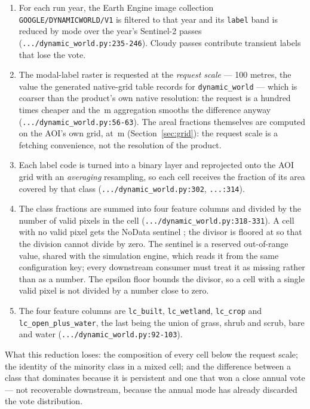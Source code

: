 \documentclass[11pt,a4paper]{article}
\newcommand{\code}[1]{\texttt{#1}}
\begin{document}
\begin{enumerate}
\item For each run year, the Earth Engine image collection
\code{GOOGLE/DYNAMICWORLD/V1} is filtered to that year and its \code{label}
band is reduced by mode over the year's Sentinel-2 passes
(\code{.../dynamic\_world.py:235-246}). Cloudy passes contribute transient
labels that lose the vote.
\item The modal-label raster is requested at the \emph{request scale} --- 100
metres, the value the generated native-grid table records for
\code{dynamic\_world} --- which is coarser than the product's own native
resolution: the request is a hundred times cheaper and the
\,m aggregation smooths the difference anyway
(\code{.../dynamic\_world.py:56-63}). The areal fractions themselves are
computed on the AOI's own grid, at \,m
(Section~\ref{sec:grid}): the request scale is a fetching convenience, not
the resolution of the product.
\item Each label code is turned into a binary layer and reprojected onto the
AOI grid with an \emph{averaging} resampling, so each cell receives the
fraction of its area covered by that class
(\code{.../dynamic\_world.py:302}, \code{...:314}).
\item The class fractions are summed into four feature columns and divided by
the number of valid pixels in the cell
(\code{.../dynamic\_world.py:318-331}). A cell with no valid pixel gets the
NoData sentinel ; the divisor is floored at
 so that the division cannot divide by
zero. The sentinel is a reserved out-of-range value, shared with the
simulation engine, which reads it from the same configuration key; every
downstream consumer must treat it as missing rather than as a number. The
epsilon floor bounds the divisor, so a cell with a single valid pixel is not
divided by a number close to zero.
\item The four feature columns are \code{lc\_built},
\code{lc\_wetland}, \code{lc\_crop} and \code{lc\_open\_plus\_water}, the last
being the union of grass, shrub and scrub, bare and water
(\code{.../dynamic\_world.py:92-103}).
\end{enumerate}

What this reduction loses: the composition of every cell below the request
scale; the identity of the minority class in a mixed cell; and the difference
between a class that dominates because it is persistent and one that won a
close annual vote --- not recoverable downstream, because the annual mode has
already discarded the vote distribution.
\end{document}
